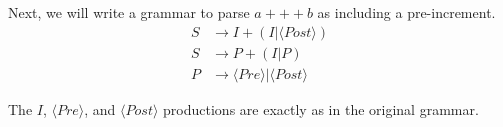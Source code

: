 \documentclass[letterpaper,11pt]{article}
\begin{document}
\begin{enumerate}
        Next, we will write a grammar to parse $a+++b$ as including a
        pre-increment.
        \begin{align*}
            S &\to I + ( I | \langle Post \rangle ) \\
            S &\to P + (I | P) \\
            P &\to \langle Pre \rangle | \langle Post \rangle
        \end{align*}

        The $I$, $\langle Pre \rangle$, and $\langle Post \rangle$ productions
        are exactly as in the original grammar.

\end{enumerate}
\end{document}
